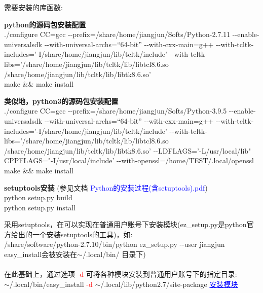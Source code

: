 \documentclass[10pt,a4paper]{article}
\begin{document}
需要安装的库函数:\\

\textbf{python的源码包安装配置}\\
./configure CC=gcc -\/-prefix=/share/home/jiangjun/Softs/Python-2.7.11  -\/-enable-universalsdk -\/-with-universal-archs=``64-bit''  -\/-with-cxx-main=g++ -\/-with-tcltk-includes='-I/share/home/jiangjun/lib/tcltk/include' -\/-with-tcltk-libs='/share/home/jiangjun/lib/tcltk/lib/libtcl8.6.so /share/home/jiangjun/lib/tcltk/lib/libtk8.6.so'\\
make \&\& make install

\textbf{类似地，python3的源码包安装配置}\\
./configure CC=gcc -\/-prefix=/share/home/jiangjun/Softs/Python-3.9.5  -\/-enable-universalsdk -\/-with-universal-archs=``64-bit''  -\/-with-cxx-main=g++ -\/-with-tcltk-includes='-I/share/home/jiangjun/lib/tcltk/include' -\/-with-tcltk-libs='/share/home/jiangjun/lib/tcltk/lib/libtcl8.6.so /share/home/jiangjun/lib/tcltk/lib/libtk8.6.so' -\/-LDFLAGS='-L/usr/local/lib" CPPFLAGS="-I/usr/local/include' -\/-with-openssl=/home/TEST/.local/openssl \\
make \&\& make install

\textbf{setuptools安装} (参见文档 \textcolor{blue}{\textrm{Python}的安装过程(含\textrm{setuptools}).pdf})\\
python setup.py build\\
python setup.py install


采用\textrm{setuptools}，在可以实现在普通用户账号下安装模块(\textrm{ez\_setup.py}是\textrm{python}官方给出的一个安装\textrm{setuptools}的工具)，如:\\
/share/software/python-2.7.10/bin/python ez\_setup.py -\/-user jiangjun\\
\textrm{easy\_install}会被安装在$\sim$/.local/bin/ 目录下)\\\\

在此基础上，通过选项 \textcolor{red}{-d} 可将各种模块安装到普通用户账号下的指定目录:\\
$\sim$/.local/bin/easy\_install \textcolor{red}{-d} $\sim$/.local/lib/python2.7/site-package \textcolor{blue}{\underline{安装模块}}
\end{document}

